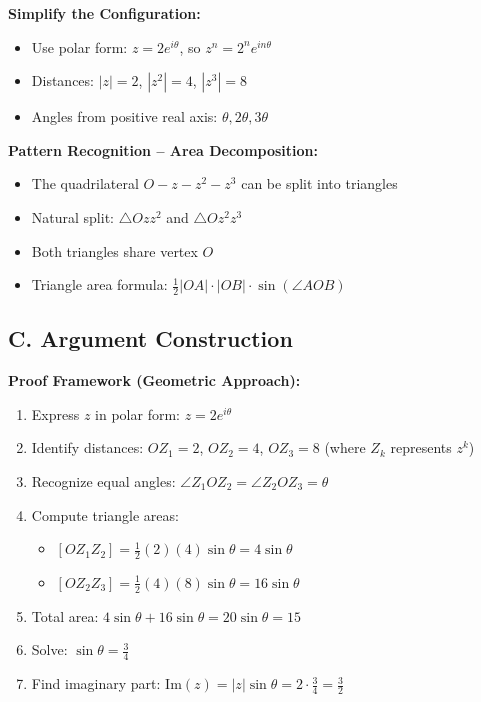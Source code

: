 \documentclass[12pt]{article}
\begin{document}
\begin{strategicbox}
\textbf{Simplify the Configuration:}
\begin{itemize}
    \item Use polar form: $z = 2e^{i\theta}$, so $z^n = 2^n e^{in\theta}$
    \item Distances: $|z| = 2$, $|z^2| = 4$, $|z^3| = 8$
    \item Angles from positive real axis: $\theta, 2\theta, 3\theta$
\end{itemize}

\textbf{Pattern Recognition -- Area Decomposition:}
\begin{itemize}
    \item The quadrilateral $O - z - z^2 - z^3$ can be split into triangles
    \item Natural split: $\triangle Ozz^2$ and $\triangle Oz^2z^3$
    \item Both triangles share vertex $O$
    \item Triangle area formula: $\frac{1}{2}|OA| \cdot |OB| \cdot \sin(\angle AOB)$
\end{itemize}

\subsection*{C. Argument Construction}

\textbf{Proof Framework (Geometric Approach):}
\begin{enumerate}
    \item Express $z$ in polar form: $z = 2e^{i\theta}$
    \item Identify distances: $OZ_1 = 2$, $OZ_2 = 4$, $OZ_3 = 8$ (where $Z_k$ represents $z^k$)
    \item Recognize equal angles: $\angle Z_1OZ_2 = \angle Z_2OZ_3 = \theta$
    \item Compute triangle areas:
    \begin{itemize}
        \item $[OZ_1Z_2] = \frac{1}{2}(2)(4)\sin\theta = 4\sin\theta$
        \item $[OZ_2Z_3] = \frac{1}{2}(4)(8)\sin\theta = 16\sin\theta$
    \end{itemize}
    \item Total area: $4\sin\theta + 16\sin\theta = 20\sin\theta = 15$
    \item Solve: $\sin\theta = \frac{3}{4}$
    \item Find imaginary part: $\text{Im}(z) = |z|\sin\theta = 2 \cdot \frac{3}{4} = \frac{3}{2}$
\end{enumerate}


\end{strategicbox}
\end{document}

